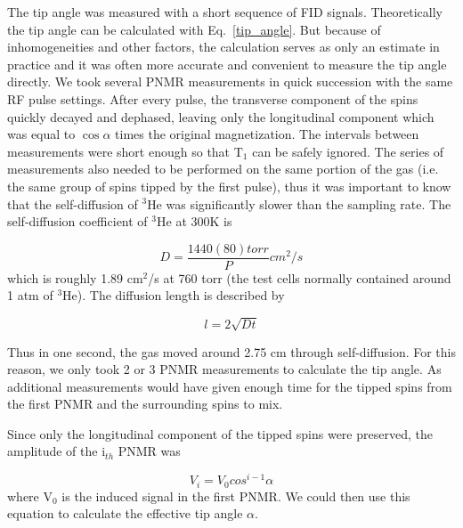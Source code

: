 The tip angle was measured with a short sequence of FID signals. Theoretically the tip angle can be calculated with Eq.~\ref{tip_angle}. But because of inhomogeneities and other factors, the calculation serves as only an estimate in practice and it was often more accurate and convenient to measure the tip angle directly. We took several PNMR measurements in quick succession with the same RF pulse settings. After every pulse, the transverse component of the spins quickly decayed and dephased, leaving only the longitudinal component which was equal to $\cos{\alpha}$ times the original magnetization. The intervals between measurements were short enough so that T$_{1}$ can be safely ignored. The series of measurements also needed to be performed on the same portion of the gas (i.e. the same group of spins tipped by the first pulse), thus it was important to know that the self-diffusion of $^{3}$He was significantly slower than the sampling rate. The self-diffusion coefficient of $^{3}$He at 300K is~\cite{J.Phys.France.35}

\begin{equation}
D=\frac{1440(80)torr}{P}cm^{2}/s
\end{equation}
which is roughly 1.89 cm$^{2}$/s at 760 torr (the test cells normally contained around 1 atm of $^{3}$He). The diffusion length is described by

\begin{equation}
l = 2\sqrt{Dt}
\end{equation}

Thus in one second, the gas moved around 2.75 cm through self-diffusion. For this reason, we only took 2 or 3 PNMR measurements to calculate the tip angle. As additional measurements would have given enough time for the tipped spins from the first PNMR and the surrounding spins to mix.

Since only the longitudinal component of the tipped spins were preserved, the amplitude of the i$_{th}$ PNMR was

\begin{equation}
V_{i}=V_{0}cos^{i-1}\alpha 
\end{equation}
where V$_{0}$ is the induced signal in the first PNMR. We could then use this equation to calculate the effective tip angle $\alpha$.






